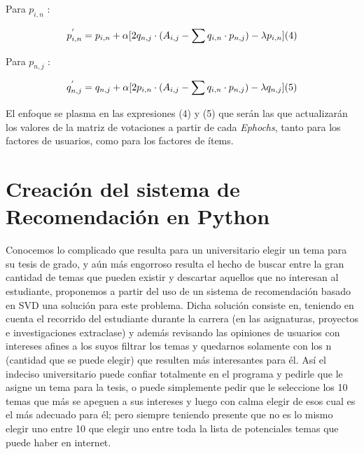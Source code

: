 \documentclass{article}
\begin{document}
Para $p_{i, n}$ :

$$
p_{i, n}^{'} = p_{i, n} + \alpha[2q_{n, j}\cdot (A_{i, j} - \sum q_{i, n}\cdot p_{n, j}) - \lambda p_{i, n}] \space (4)
$$

Para $p_{n, j}$ :

$$
q_{n, j}^{'} = q_{n, j} + \alpha[2p_{i, n}\cdot (A_{i, j} - \sum q_{i, n}\cdot p_{n, j}) - \lambda q_{n, j}] \space (5)
$$

El enfoque se plasma en las expresiones (4) y 
(5) que serán las que actualizarán los valores de 
la matriz de votaciones a partir de cada \textit{Ephochs}, 
tanto para los factores de usuarios, como para los 
factores de ítems.


\section{Creación del sistema de Recomendación en Python}

Conocemos lo complicado que resulta para un universitario elegir un tema para su tesis de grado, y aún más engorroso resulta el hecho de buscar entre la gran cantidad de temas que pueden existir y descartar aquellos que no interesan al estudiante, proponemos a partir del uso de un sistema de recomendación basado en SVD una solución para este problema. Dicha solución consiste en, teniendo en cuenta el recorrido del estudiante durante la carrera (en las asignaturas, proyectos e investigaciones extraclase) y además revisando las opiniones de usuarios con intereses afines a los suyos filtrar los temas y quedarnos solamente con los n (cantidad que se puede elegir) que resulten más interesantes para él.
Así el indeciso universitario puede confiar totalmente en el programa y pedirle que le asigne un tema para la tesis, o puede simplemente pedir que le seleccione los 10 temas que más se apeguen a sus intereses y luego con calma elegir de esos cual es el más adecuado para él; pero siempre teniendo presente que no es lo mismo elegir uno entre 10 que elegir uno entre toda la lista de potenciales temas que puede haber en internet.
\end{document}
